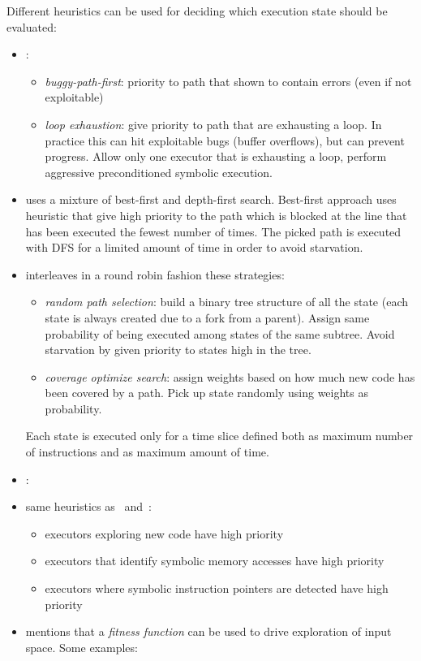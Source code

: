 Different heuristics can be used for deciding which execution state should be evaluated:
\begin{itemize}

  \item \cite{AEG-NDSS11}:
  \begin{itemize}
    \item {\em buggy-path-first}: priority to path that shown to contain errors (even if not exploitable)
    \item {\em loop exhaustion}: give priority to path that are exhausting a loop. In practice this can hit exploitable bugs (buffer overflows), but can prevent progress. Allow only one executor that is exhausting a loop, perform aggressive preconditioned symbolic execution.
  \end{itemize}

  \item \cite{EXE-CCS06} uses a mixture of best-first and depth-first search. Best-first approach uses heuristic that give high priority to the path which is blocked at the line that has been executed the fewest number of times. The picked path is executed with DFS for a limited amount of time in order to avoid starvation. 

  \item \cite{KLEE-OSDI08} interleaves in a round robin fashion these strategies:
  \begin{itemize}
    \item {\em random path selection}: build a binary tree structure of all the state (each state is always created due to a fork from a parent). Assign same probability of being executed among states of the same subtree. Avoid starvation by given priority to states high in the tree.
    \item {\em coverage optimize search}: assign weights based on how much new code has been covered by a path. Pick up state randomly using weights as probability.
  \end{itemize}
  Each state is executed only for a time slice defined both as maximum number of instructions and as maximum amount of time.

  \item \cite{SAGE-NDSS08}:

  \item \cite{MAYHEM-SP12} same heuristics as~\cite{SAGE-NDSS08} and~\cite{KLEE-OSDI08}:
  \begin{itemize}
    \item executors exploring new code have high priority
    \item executors that identify symbolic memory accesses have high priority
    \item executors where symbolic instruction pointers are detected have high priority
  \end{itemize}

  \item \cite{CS-ACM13} mentions that a {\em fitness function} can be used to drive exploration of input space. Some examples: 

\end{itemize}



